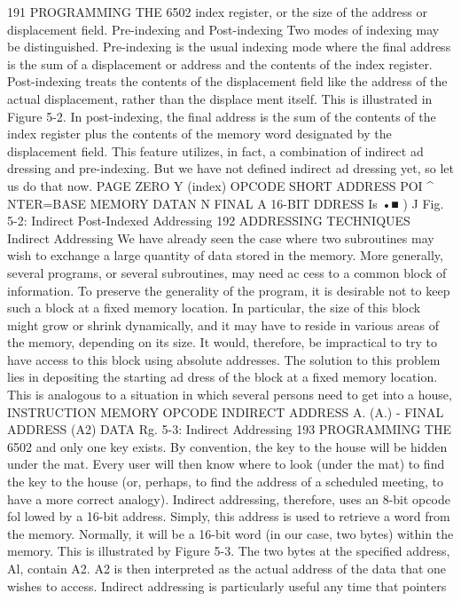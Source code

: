 191
PROGRAMMING THE 6502
index register, or the size of the address or displacement field.
Pre-indexing and Post-indexing
Two modes of indexing may be distinguished. Pre-indexing is
the usual indexing mode where the final address is the sum of a
displacement or address and the contents of the index register.
Post-indexing treats the contents of the displacement field like
the address of the actual displacement, rather than the displace
ment itself. This is illustrated in Figure 5-2. In post-indexing, the
final address is the sum of the contents of the index register plus
the contents of the memory word designated by the displacement
field. This feature utilizes, in fact, a combination of indirect ad
dressing and pre-indexing. But we have not defined indirect ad
dressing yet, so let us do that now.
PAGE ZERO Y (index)
OPCODE
SHORT ADDRESS
POI
^
NTER=BASE
MEMORY
DATAN
N
FINAL
A
16-BIT
DDRESS
Is
•■ )
J
Fig. 5-2: Indirect Post-Indexed Addressing
192
ADDRESSING TECHNIQUES
Indirect Addressing
We have already seen the case where two subroutines may wish
to exchange a large quantity of data stored in the memory. More
generally, several programs, or several subroutines, may need ac
cess to a common block of information. To preserve the generality
of the program, it is desirable not to keep such a block at a fixed
memory location. In particular, the size of this block might grow
or shrink dynamically, and it may have to reside in various
areas of the memory, depending on its size. It would, therefore,
be impractical to try to have access to this block using absolute
addresses.
The solution to this problem lies in depositing the starting ad
dress of the block at a fixed memory location. This is analogous
to a situation in which several persons need to get into a house,
INSTRUCTION MEMORY
OPCODE
INDIRECT
ADDRESS A.
(A.)
-
FINAL
ADDRESS (A2)
DATA
Rg. 5-3: Indirect Addressing
193
PROGRAMMING THE 6502
and only one key exists. By convention, the key to the house
will be hidden under the mat. Every user will then know where to
look (under the mat) to find the key to the house (or, perhaps, to
find the address of a scheduled meeting, to have a more correct
analogy). Indirect addressing, therefore, uses an 8-bit opcode fol
lowed by a 16-bit address. Simply, this address is used to retrieve
a word from the memory. Normally, it will be a 16-bit word (in our
case, two bytes) within the memory. This is illustrated by Figure
5-3. The two bytes at the specified address, Al, contain A2. A2 is
then interpreted as the actual address of the data that one wishes
to access.
Indirect addressing is particularly useful any time that pointers
